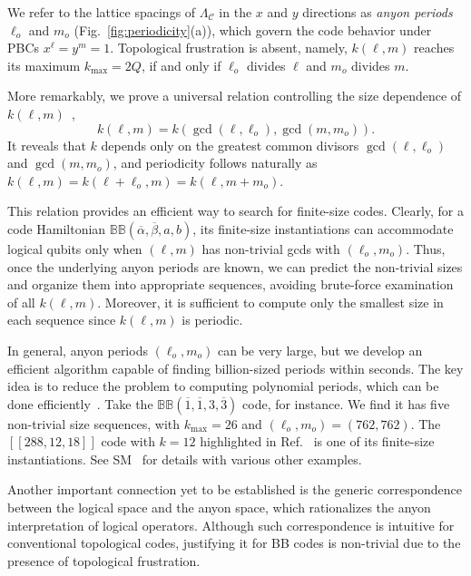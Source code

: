 \documentclass[aps,prl,english,superscriptaddress,twocolumn,tightenlines,showpacs,longbibliography,floatfix,amsfonts]{revtex4-2}
\begin{document}
	We refer to the lattice spacings of $\Lambda_{\mathscr{C}}$ in the $x$ and $y$ directions as \textit{anyon periods} $\ell_o$ and $m_o$ (Fig.~\ref{fig:periodicity}(a)), which govern the code behavior under PBCs $x^\ell = y^m=1$. Topological frustration is absent, namely, $k(\ell, m)$ reaches its maximum $k_{\mathrm{max}} = 2Q$, if and only if $\ell_o$ divides $\ell$ and $m_o$ divides $m$.
	
	
	More remarkably, we prove a universal relation controlling the size dependence of $k(\ell,m)$~\cite{SM1},
	\begin{equation}\label{eq:k_relation}
		k\left(\ell,m\right)=k\left(\gcd\left(\ell,\ell_o\right),\gcd(m,m_o)
		\right).
	\end{equation}
	It reveals that $k$ depends only on the greatest common divisors
	$\gcd\left(\ell,\ell_o\right)$ and $\gcd(m,m_o)$, and periodicity follows naturally as $k\left(\ell,m\right)=k\left(\ell+\ell_o,m\right)=k(\ell,m+m_o)$.
	
	
	This relation provides an efficient way to search for finite-size codes.
	Clearly, for a code Hamiltonian $\mathbb{BB}(\overline{\alpha}, \overline{\beta}, a, b)$, its finite-size instantiations can accommodate logical qubits only when $(\ell, m)$ has non-trivial gcds with $(\ell_o, m_o)$.
	Thus, once the underlying anyon periods are known, we can predict the non-trivial sizes and organize them into appropriate sequences, avoiding brute-force examination of all $k(\ell, m)$.
	Moreover, it is sufficient to compute only the smallest size in each sequence since $k\left(\ell,m\right)$ is periodic.
	
	
	In general, anyon periods $(\ell_o, m_o)$ can be very large, but we develop an efficient algorithm capable of finding billion-sized periods within seconds.
	The key idea is to reduce the problem to computing polynomial periods, which can be done efficiently~\cite{SM1}.
	Take the $\mathbb{BB}(\overline{1},\overline{1},3,\overline{3})$ code, for instance.
	We find it has five non-trivial size sequences, with $k_{\max} = 26$ and $(\ell_o, m_o) = (762,762)$.
	The $[[288,12,18]]$ code with $k=12$ highlighted in Ref.~\cite{Bravyi24} is one of its finite-size instantiations.
	See SM~\cite{SM1} for details with various other examples.
	
	
	Another important connection yet to be established is the generic correspondence between the logical space and the anyon space, which rationalizes the anyon interpretation of logical operators. 
	Although such correspondence is intuitive for conventional topological codes, justifying it for BB codes is non-trivial due to the presence of topological frustration.
	
\end{document}
